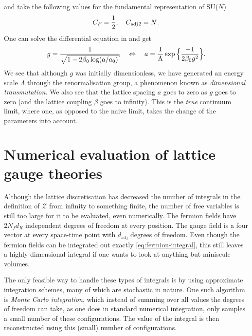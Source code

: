 %
and take the following values for the fundamental representation of SU($N$)
%
\begin{equation}
  C_F = \frac{1}{2}, \hskip1em C_{\text{adj}\hskip.2ex 2} = N \,.
\end{equation}
%
One can solve the differential equation in  and get
%
\begin{equation} \label{eq:running-coupling}
  g = \frac{1}{\sqrt{1 - 2\beta_0 \log (a/a_0)}}
    \hskip1em\Leftrightarrow\hskip1em
    a = \frac{1}{\Lambda} \exp\Big\{\frac{-1}{2\beta_0 g^2}\Big\} .
\end{equation}
%
We see that although $g$ was initially dimensionless, we have generated an
energy scale $\Lambda$ through the renormalisation group, a phenomenon known as
\emph{dimensional transmutation}. We also see that the lattice spacing $a$ goes
to zero as $g$ goes to zero (and the lattice coupling $\beta$ goes to infinity).
This is the \emph{true} continuum limit, where one, as opposed to the naive
limit, takes the change of the parameters into account.

\section{Numerical evaluation of lattice gauge theories}
\label{sec:numerical_eval}

Although the lattice discretisation has decreased the number of integrals in the
definition of $\mathcal{Z}$ from infinity to something finite, the number of free
variables is still too large for it to be evaluated, even numerically. The
fermion fields have $2 N_f d_R$ independent degrees of freedom at every
position. The gauge field is a four vector at every space-time point with
$d_{\text{adj}}$ degrees of freedom. Even though the fermion fields can be
integrated out exactly \eqref{eq:fermion-integral}, this still leaves a highly
dimensional integral if one wants to look at anything but miniscule volumes.

The only feasible way to handle these types of integrals is by using approximate
integration schemes, many of which are stochastic in nature. One such algorithm
is \emph{Monte Carlo integration}, which instead of summing over all
values the degrees of freedom can take, as one does in standard numerical
integration, only samples a small number of these configurations. The value of
the integral is then reconstructed using this (small) number of configurations.

